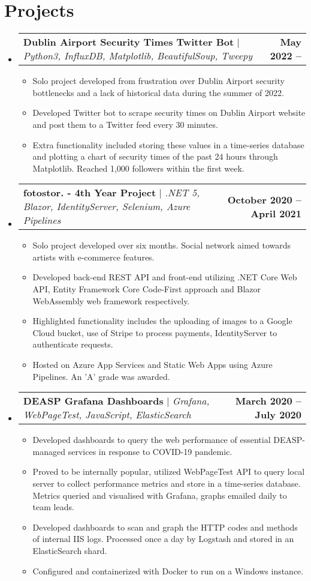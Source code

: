 \documentclass[letterpaper,11pt]{article}
\makeatletter
\newcommand{\resumeItem}[1]{
  \item\small{
    {#1 \vspace{-2pt}}
  }
}
\newcommand{\resumeProjectHeading}[2]{
    \item
    \begin{tabular*}{1.001\textwidth}{l@{\extracolsep{\fill}}r}
      \small#1 & \textbf{\small #2}\\
    \end{tabular*}\vspace{-7pt}
}
\newcommand{\resumeSubHeadingListStart}{\begin{itemize}[leftmargin=0.0in, label={}]}
\newcommand{\resumeSubHeadingListEnd}{\end{itemize}}
\newcommand{\resumeItemListStart}{\begin{itemize}}
\newcommand{\resumeItemListEnd}{\end{itemize}\vspace{-5pt}}
\makeatother
\begin{document}
\section{Projects}
\vspace{-5pt}
\resumeSubHeadingListStart
\resumeProjectHeading
{\textbf{Dublin Airport Security Times Twitter Bot} $|$ \emph{Python3, InfluxDB, Matplotlib, BeautifulSoup, Tweepy }}{May 2022 --}
\resumeItemListStart
\resumeItem{Solo project developed from frustration over Dublin Airport security bottlenecks and a lack of historical data during the summer of 2022.}
\resumeItem{Developed Twitter bot to scrape security times on Dublin Airport website and post them to a Twitter feed every 30 minutes.}
\resumeItem{Extra functionality included storing these values in a time-series database and plotting a chart of security times of the past 24 hours through Matplotlib. Reached 1,000 followers within the first week.}
\resumeItemListEnd
\vspace{-12pt}
\resumeProjectHeading
{\textbf{fotostor. - 4th Year Project} $|$ \emph{.NET 5, Blazor, IdentityServer, Selenium, Azure Pipelines}}{October 2020 -- April 2021}
\resumeItemListStart
\resumeItem{Solo project developed over six months. Social network aimed towards artists with e-commerce features.}
\resumeItem{Developed back-end REST API and front-end utilizing .NET Core Web API, Entity Framework Core Code-First approach and Blazor WebAssembly web framework respectively.}
\resumeItem{Highlighted functionality includes the uploading of images to a Google Cloud bucket, use of Stripe to process payments, IdentityServer to authenticate requests.}
\resumeItem{Hosted on Azure App Services and Static Web Apps using Azure Pipelines. An 'A' grade was awarded.}
\resumeItemListEnd
\vspace{-12pt}
\resumeProjectHeading
{\textbf{DEASP Grafana Dashboards} $|$ \emph{Grafana, WebPageTest, JavaScript, ElasticSearch}}{March 2020 -- July 2020}
\resumeItemListStart
\resumeItem{Developed dashboards to query the web performance of essential DEASP-managed services in response to COVID-19 pandemic.}
\resumeItem{Proved to be internally popular, utilized WebPageTest API to query local server to collect performance metrics and store in a time-series database. Metrics queried and visualised with Grafana, graphs emailed daily to team leads. }
\resumeItem{Developed dashboards to scan and graph the HTTP codes and methods of internal IIS logs. Processed once a day by Logstash and stored in an ElasticSearch shard.}
\resumeItem{Configured and containerized with Docker to run on a Windows instance.}
\resumeItemListEnd 
\vspace{-4pt}
\resumeSubHeadingListEnd
\end{document}

